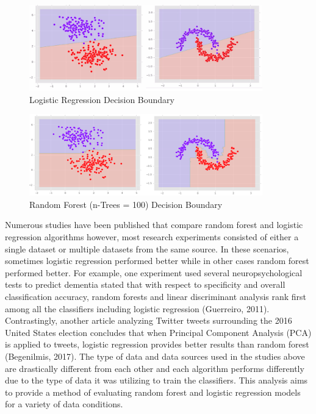 \documentclass{llncs}
\begin{document}
\begin{figure}
\centering
\includegraphics[width=0.9\textwidth]{decisionboundary.png}
\caption{Logistic Regression Decision Boundary}
\end{figure}

\begin{figure}
\centering
\includegraphics[width=0.9\textwidth]{decisionboundary2.png}
\caption{Random Forest (n-Trees = 100) Decision Boundary}
\end{figure}


Numerous studies have been published that compare random forest and logistic regression algorithms however, most research experiments consisted of either a single dataset or multiple datasets from the same source. In these scenarios, sometimes logistic regression performed better while in other cases random forest performed better. For example, one experiment used several neuropsychological tests to predict dementia stated that with respect to specificity and overall classification accuracy, random forests and linear discriminant analysis rank first among all the classifiers including logistic regression (Guerreiro, 2011). Contrastingly, another article analyzing Twitter tweets surrounding the 2016 United States election concludes that when Principal Component Analysis (PCA) is applied to tweets, logistic regression provides better results than random forest (Begenilmis, 2017). The type of data and data sources used in the studies above are drastically different from each other and each algorithm performs differently due to the type of data it was utilizing to train the classifiers. This analysis aims to provide a method of evaluating random forest and logistic regression models for a variety of data conditions.
\end{document}
